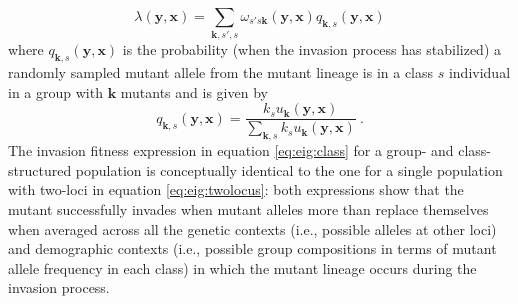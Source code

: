 \documentclass[11pt]{article}
\renewcommand{\vec}[1]{\symbf{#1}}
\newcommand{\eig}{\lambda}
\begin{document}
\begin{equation}
  \label{eq:eig:class}
  \eig(\vec{y}, \vec{x}) = \sum_{\vec{k},s',s} \omega_{s's\vec{k}}(\vec{y}, \vec{x}) q_{\vec{k},s}(\vec{y}, \vec{x})
\end{equation}
where $q_{\vec{k},s}(\vec{y}, \vec{x})$ is the probability (when the invasion process has stabilized) a randomly sampled mutant allele from the mutant lineage is in a class $s$ individual in a group with $\vec{k}$ mutants and is given by
\begin{equation*}
  q_{\vec{k},s}(\vec{y}, \vec{x}) = \frac{k_{s} u_{\vec{k}}(\vec{y}, \vec{x})}{\sum_{\vec{k},s} k_{s} u_{\vec{k}}(\vec{y}, \vec{x})} \: .
\end{equation*}
The invasion fitness expression in equation \eqref{eq:eig:class} for a group- and class-structured population is conceptually identical to the one for a single population with two-loci in equation \eqref{eq:eig:twolocus}: both expressions show that the mutant successfully invades when mutant alleles more than replace themselves when averaged across all the genetic contexts (i.e., possible alleles at other loci) and demographic contexts (i.e., possible group compositions in terms of mutant allele frequency in each class) in which the mutant lineage occurs during the invasion process.
\end{document}
